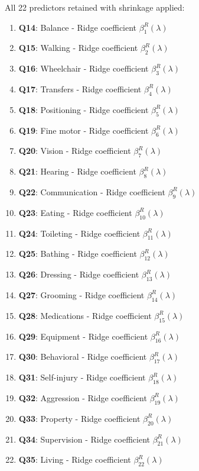 All 22 predictors retained with shrinkage applied:
\begin{enumerate}
    \item \textbf{Q14}: Balance - Ridge coefficient $\beta_1^R(\lambda)$
    \item \textbf{Q15}: Walking - Ridge coefficient $\beta_2^R(\lambda)$
    \item \textbf{Q16}: Wheelchair - Ridge coefficient $\beta_3^R(\lambda)$
    \item \textbf{Q17}: Transfers - Ridge coefficient $\beta_4^R(\lambda)$
    \item \textbf{Q18}: Positioning - Ridge coefficient $\beta_5^R(\lambda)$
    \item \textbf{Q19}: Fine motor - Ridge coefficient $\beta_6^R(\lambda)$
    \item \textbf{Q20}: Vision - Ridge coefficient $\beta_7^R(\lambda)$
    \item \textbf{Q21}: Hearing - Ridge coefficient $\beta_8^R(\lambda)$
    \item \textbf{Q22}: Communication - Ridge coefficient $\beta_9^R(\lambda)$
    \item \textbf{Q23}: Eating - Ridge coefficient $\beta_{10}^R(\lambda)$
    \item \textbf{Q24}: Toileting - Ridge coefficient $\beta_{11}^R(\lambda)$
    \item \textbf{Q25}: Bathing - Ridge coefficient $\beta_{12}^R(\lambda)$
    \item \textbf{Q26}: Dressing - Ridge coefficient $\beta_{13}^R(\lambda)$
    \item \textbf{Q27}: Grooming - Ridge coefficient $\beta_{14}^R(\lambda)$
    \item \textbf{Q28}: Medications - Ridge coefficient $\beta_{15}^R(\lambda)$
    \item \textbf{Q29}: Equipment - Ridge coefficient $\beta_{16}^R(\lambda)$
    \item \textbf{Q30}: Behavioral - Ridge coefficient $\beta_{17}^R(\lambda)$
    \item \textbf{Q31}: Self-injury - Ridge coefficient $\beta_{18}^R(\lambda)$
    \item \textbf{Q32}: Aggression - Ridge coefficient $\beta_{19}^R(\lambda)$
    \item \textbf{Q33}: Property - Ridge coefficient $\beta_{20}^R(\lambda)$
    \item \textbf{Q34}: Supervision - Ridge coefficient $\beta_{21}^R(\lambda)$
    \item \textbf{Q35}: Living - Ridge coefficient $\beta_{22}^R(\lambda)$
\end{enumerate}

